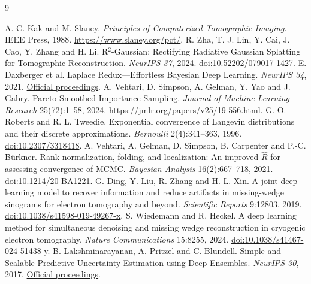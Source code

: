 \documentclass[11pt,a4paper]{article}
\begin{document}
\begin{thebibliography}{9}\small\raggedright
{} A. C. Kak and M. Slaney. \emph{Principles of Computerized Tomographic Imaging}. IEEE Press, 1988. \url{https://www.slaney.org/pct/}.
 R. Zha, T. J. Lin, Y. Cai, J. Cao, Y. Zhang and H. Li. R$^2$-Gaussian: Rectifying Radiative Gaussian Splatting for Tomographic Reconstruction. \emph{NeurIPS 37}, 2024. \href{https://doi.org/10.52202/079017-1427}{doi:10.52202/079017-1427}.
 E. Daxberger et al. Laplace Redux---Effortless Bayesian Deep Learning. \emph{NeurIPS 34}, 2021. \href{https://proceedings.neurips.cc/paper_files/paper/2021/hash/a7c9585703d275249f30a088cebba0ad-Abstract.html}{Official proceedings}.
 A. Vehtari, D. Simpson, A. Gelman, Y. Yao and J. Gabry. Pareto Smoothed Importance Sampling. \emph{Journal of Machine Learning Research} 25(72):1--58, 2024. \url{https://jmlr.org/papers/v25/19-556.html}.
 G. O. Roberts and R. L. Tweedie. Exponential convergence of Langevin distributions and their discrete approximations. \emph{Bernoulli} 2(4):341--363, 1996. \href{https://doi.org/10.2307/3318418}{doi:10.2307/3318418}.
 A. Vehtari, A. Gelman, D. Simpson, B. Carpenter and P.-C. B\"urkner. Rank-normalization, folding, and localization: An improved $\widehat R$ for assessing convergence of MCMC. \emph{Bayesian Analysis} 16(2):667--718, 2021. \href{https://doi.org/10.1214/20-BA1221}{doi:10.1214/20-BA1221}.
 G. Ding, Y. Liu, R. Zhang and H. L. Xin. A joint deep learning model to recover information and reduce artifacts in missing-wedge sinograms for electron tomography and beyond. \emph{Scientific Reports} 9:12803, 2019. \href{https://doi.org/10.1038/s41598-019-49267-x}{doi:10.1038/s41598-019-49267-x}.
 S. Wiedemann and R. Heckel. A deep learning method for simultaneous denoising and missing wedge reconstruction in cryogenic electron tomography. \emph{Nature Communications} 15:8255, 2024. \href{https://doi.org/10.1038/s41467-024-51438-y}{doi:10.1038/s41467-024-51438-y}.
 B. Lakshminarayanan, A. Pritzel and C. Blundell. Simple and Scalable Predictive Uncertainty Estimation using Deep Ensembles. \emph{NeurIPS 30}, 2017. \href{https://proceedings.neurips.cc/paper_files/paper/2017/hash/9ef2ed4b7fd2c810847ffa5fa85bce38-Abstract.html}{Official proceedings}.
\end{thebibliography}
\end{document}
